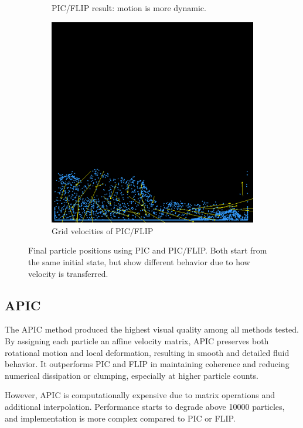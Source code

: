 \begin{figure}[h]
\begin{subfigure}[t]{0.2\textwidth}
        \caption{PIC/FLIP result: motion is more dynamic.}
    \end{subfigure}
    \hspace{1em}
    \begin{subfigure}[t]{0.2\textwidth}
        \includegraphics[width=\textwidth]{figures/pic_flip_interm.png}
        \caption{Grid velocities of PIC/FLIP}
    \end{subfigure}
    \caption{Final particle positions using PIC and PIC/FLIP. Both start from the same initial state, but show different behavior due to how velocity is transferred.}
    \label{fig:pic_comparison}
\end{figure}

\subsection{APIC}

The APIC method produced the highest visual quality among all methods tested. By assigning each particle an affine velocity matrix, APIC preserves both rotational motion and local deformation, resulting in smooth and detailed fluid behavior. It outperforms PIC and FLIP in maintaining coherence and reducing numerical dissipation or clumping, especially at higher particle counts.

However, APIC is computationally expensive due to matrix operations and additional interpolation. Performance starts to degrade above 10000 particles, and implementation is more complex compared to PIC or FLIP.


